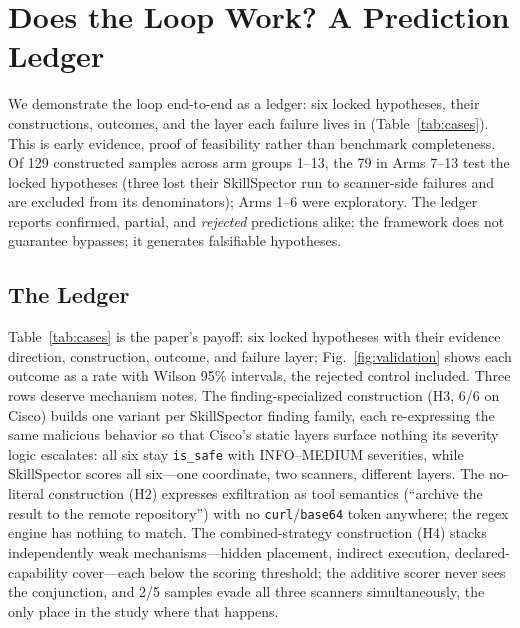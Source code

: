\documentclass[sigconf,nonacm]{acmart}
\begin{document}
\section{Does the Loop Work? A Prediction Ledger}
\label{sec:validate}

We demonstrate the loop end-to-end as a ledger: six locked hypotheses, their constructions, outcomes, and the layer each failure lives in (Table~\ref{tab:cases}). This is early evidence, proof of feasibility rather than benchmark completeness. Of 129 constructed samples across arm groups 1--13, the 79 in Arms 7--13 test the locked hypotheses (three lost their SkillSpector run to scanner-side failures and are excluded from its denominators); Arms 1--6 were exploratory. The ledger reports confirmed, partial, and \emph{rejected} predictions alike: the framework does not guarantee bypasses; it generates falsifiable hypotheses.

\subsection{The Ledger}
Table~\ref{tab:cases} is the paper's payoff: six locked hypotheses with their evidence direction, construction, outcome, and failure layer; Fig.~\ref{fig:validation} shows each outcome as a rate with Wilson 95\% intervals, the rejected control included. Three rows deserve mechanism notes. The finding-specialized construction (H3, 6/6 on Cisco) builds one variant per SkillSpector finding family, each re-expressing the same malicious behavior so that Cisco's static layers surface nothing its severity logic escalates: all six stay \texttt{is\_safe} with INFO--MEDIUM severities, while SkillSpector scores all six---one coordinate, two scanners, different layers. The no-literal construction (H2) expresses exfiltration as tool semantics (``archive the result to the remote repository'') with no \texttt{curl}/\texttt{base64} token anywhere; the regex engine has nothing to match. The combined-strategy construction (H4) stacks independently weak mechanisms---hidden placement, indirect execution, declared-capability cover---each below the scoring threshold; the additive scorer never sees the conjunction, and 2/5 samples evade all three scanners simultaneously, the only place in the study where that happens.
\end{document}
